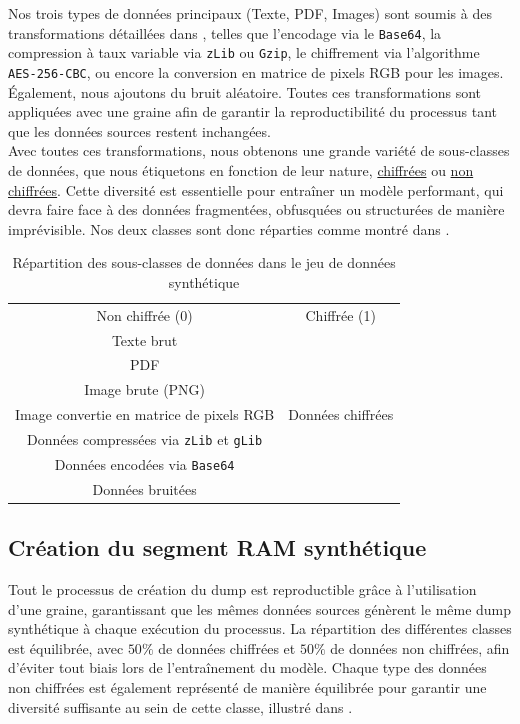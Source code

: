 \documentclass[12pt]{report}
\begin{document}
    Nos trois types de données principaux (Texte, PDF, Images) sont soumis à des transformations détaillées dans , telles que l'encodage via le \texttt{Base64}, la compression à taux variable via \texttt{zLib} ou \texttt{Gzip}, le chiffrement via l'algorithme \texttt{AES-256-CBC}, ou encore la conversion en matrice de pixels RGB pour les images. \'Egalement, nous ajoutons du bruit aléatoire. Toutes ces transformations sont appliquées avec une graine afin de garantir la reproductibilité du processus tant que les données sources restent inchangées.\\

    Avec toutes ces transformations, nous obtenons une grande variété de sous-classes de données, que nous étiquetons en fonction de leur nature, \underline{chiffrées} ou \underline{non chiffrées}. Cette diversité est essentielle pour entraîner un modèle performant, qui devra faire face à des données fragmentées, obfusquées ou structurées de manière imprévisible. Nos deux classes sont donc réparties comme montré dans .

    \begin{table}[H]
        \centering
        \begin{tabular}{|c|c|}
            \hline
            Non chiffrée (0) & Chiffrée (1) \\
            \hhline{|=|=|}
            Texte brut &  \\
            PDF &  \\
            Image brute (PNG) &  \\
            Image convertie en matrice de pixels RGB & Données chiffrées \\
            Données compressées via \texttt{zLib} et \texttt{gLib} &  \\
            Données encodées via \texttt{Base64} &  \\
            Données bruitées &  \\
            \hline
        \end{tabular}
        \caption{Répartition des sous-classes de données dans le jeu de données synthétique}
        \label{tab:classes}
    \end{table}



    \subsection{Création du segment RAM synthétique}\label{subsec:creation_segment_ram}
    Tout le processus de création du dump est reproductible grâce à l'utilisation d'une graine, garantissant que les mêmes données sources génèrent le même dump synthétique à chaque exécution du processus. La répartition des différentes classes est équilibrée, avec $50\%$ de données chiffrées et $50\%$ de données non chiffrées, afin d'éviter tout biais lors de l'entraînement du modèle. Chaque type des données non chiffrées est également représenté de manière équilibrée pour garantir une diversité suffisante au sein de cette classe, illustré dans .
\end{document}
